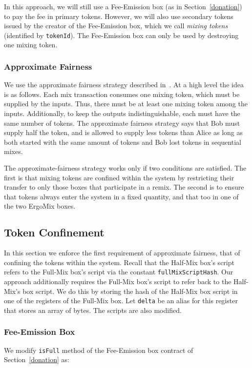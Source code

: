 \documentclass[runningheads]{llncs}
\newcommand{\mixname}{ErgoMix\xspace}
\begin{document}
In this approach, we will still use a Fee-Emission box (as in Section~\ref{donation}) to pay the fee in primary tokens. However, we will also use secondary tokens issued by the creator of the Fee-Emission box, which we call {\em mixing tokens} (identified by \texttt{tokenId}). The Fee-Emission box can only be used by destroying one mixing token.

\subsubsection{Approximate Fairness}

We use the approximate fairness strategy described in~\cite{advtutorial}. At a high level the idea is as follows.
Each mix transaction consumes one mixing token, which must be supplied by the inputs. Thus, there must be at least one mixing token among the inputs. Additionally, to keep the outputs indistinguishable, each must have the same number of tokens. The approximate fairness strategy says that Bob must supply half the token, and is allowed to supply less tokens than Alice as long as both started with the same amount of tokens and Bob lost tokens in sequential mixes.

The approximate-fairness strategy works only if two conditions are satisfied. The first is that mixing tokens are confined within the system by restricting their transfer to only those boxes that participate in a remix. 
The second is to ensure that tokens always enter the system in a fixed quantity, and that too in one of the two \mixname boxes. 

\subsection{Token Confinement}

In this section we enforce the first requirement of approximate fairness, that of confining the tokens within the system. 
Recall that the Half-Mix box's script refers to the Full-Mix box's script via the constant \texttt{fullMixScriptHash}. Our approach additionally requires the Full-Mix box's script to refer back to the Half-Mix's box script. We do this by storing the hash of the Half-Mix box script in one of the registers of the Full-Mix box. Let \texttt{delta} be an alias for this register that stores an array of bytes. The scripts are also modified.

\subsubsection{Fee-Emission Box}
We modify \texttt{isFull} method of the Fee-Emission box contract of Section~\ref{donation} as:
\end{document}

